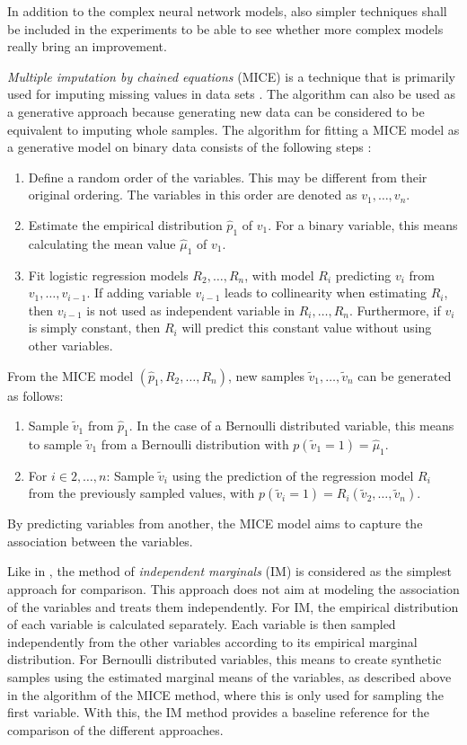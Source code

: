 \documentclass[12pt]{article}
\begin{document}
In addition to the complex neural network models, also simpler techniques shall be included in the experiments to be able to see whether more complex models really bring an improvement.

{\em Multiple imputation by chained equations} (MICE) is a technique that is primarily used for imputing missing values in data sets \citep{mice}.
The algorithm can also be used as a generative approach because generating new data can be considered to be equivalent to imputing whole samples.
The algorithm for fitting a MICE model as a generative model on binary data consists of the following steps \citep{goncalves, dsdbm}:
\begin{enumerate}
\item Define a random order of the variables. This may be different from their original ordering. The variables in this order are denoted as $v_1, \dots, v_n$.
\item Estimate the empirical distribution $\hat{p}_1$ of $v_1$. For a binary variable, this means calculating the mean value $\hat{\mu}_1$ of $v_1$.
\item Fit logistic regression models $R_2, \dots, R_n$, with model $R_i$ predicting $v_i$ from  $v_1, \dots, v_{i-1}$. If adding variable $v_{i-1}$ leads to collinearity when estimating $R_i$, then $v_{i-1}$ is not used as independent variable in $R_{i}, \dots, R_n$. Furthermore, if $v_i$ is simply constant, then $R_i$ will predict this constant value without using other variables.
\end{enumerate}

From the MICE model $(\hat{p}_1, R_2, \dots, R_n)$, new samples $\tilde{v}_1, \dots , \tilde{v}_n$ can be generated as follows:

\begin{enumerate}
\item Sample $\tilde{v}_1$ from $\hat{p}_1$.
In the case of a Bernoulli distributed variable, this means to sample $\tilde{v}_1$ from a Bernoulli distribution with $p(\tilde{v}_1 = 1) = \hat{\mu}_1$.
\item For  $i \in 2, \dots, n$: Sample $\tilde{v}_i$ using the prediction of the regression model $R_i$ from the previously sampled values, with $p(\tilde{v}_i = 1) = R_i(\tilde{v}_2, \dots, \tilde{v}_n)$.
\end{enumerate}

By predicting variables from another, the MICE model aims to capture the association between the variables.

Like in \cite{goncalves}, the method of {\em independent marginals} (IM) is considered as the simplest approach for comparison.
This approach does not aim at modeling the association of the variables and treats them independently.
For IM, the empirical distribution of each variable is calculated separately.
Each variable is then sampled independently from the other variables according to its empirical marginal distribution.
For Bernoulli distributed variables, this means to create synthetic samples using the estimated marginal means of the variables, as described above in the algorithm of the MICE method, where this is only used for sampling the first variable.
With this, the IM method provides a baseline reference for the comparison of the different approaches.
\end{document}
